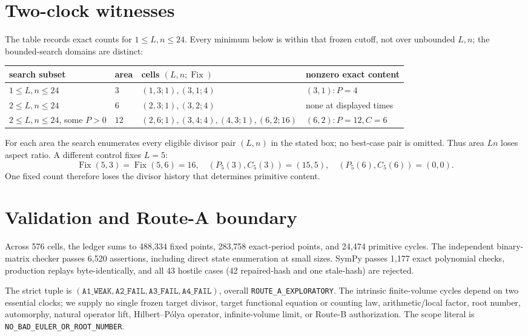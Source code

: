\documentclass[10pt]{article}
\begin{document}
\section{Two-clock witnesses}
The table records exact counts for $1\leq L,n\leq24$.  Every minimum below is
within that frozen cutoff, not over unbounded $L,n$; the bounded-search domains
are distinct:
\begin{center}
\begin{tabular}{@{}llll@{}}
\toprule
search subset & area & cells $(L,n;\operatorname{Fix})$ & nonzero exact content\\
\midrule
$1\leq L,n\leq24$ & $3$ & $(1,3;1),(3,1;4)$ & $(3,1):P=4$\\
$2\leq L,n\leq24$ & $6$ & $(2,3;1),(3,2;4)$ & none at displayed times\\
$2\leq L,n\leq24$, some $P>0$ & $12$ & $(2,6;1),(3,4;4),(4,3;1),(6,2;16)$ & $(6,2):P=12,C=6$\\
\bottomrule
\end{tabular}
\end{center}
For each area the search enumerates every eligible divisor pair $(L,n)$ in the
stated box; no best-case pair is omitted.
Thus area $Ln$ loses aspect ratio.  A different control fixes $L=5$:
\[
\operatorname{Fix}(5,3)=\operatorname{Fix}(5,6)=16,
\quad(P_5(3),C_5(3))=(15,5),\quad(P_5(6),C_5(6))=(0,0).           \tag{5}
\]
One fixed count therefore loses the divisor history that determines primitive
content.

\section{Validation and Route-A boundary}
Across 576 cells, the ledger sums to 488,334 fixed points, 283,758
exact-period points, and 24,474 primitive cycles.  The independent
binary-matrix checker passes 6,520 assertions, including direct state
enumeration at small sizes.  SymPy passes 1,177 exact polynomial checks,
production replays byte-identically, and all 43 hostile cases (42 repaired-hash
and one stale-hash) are rejected.

The strict tuple is $(\texttt{A1\_WEAK},\texttt{A2\_FAIL},
\texttt{A3\_FAIL},\texttt{A4\_FAIL})$, overall
\texttt{ROUTE\_A\_EXPLORATORY}.  The intrinsic finite-volume cycles depend on
two essential clocks; we supply no single frozen target divisor, target
functional equation or counting law, arithmetic/local factor, root number,
automorphy, natural operator lift, Hilbert--P\'olya operator, infinite-volume
limit, or Route-B authorization.  The scope literal is
\texttt{NO\_BAD\_EULER\_OR\_ROOT\_NUMBER}.
\end{document}
